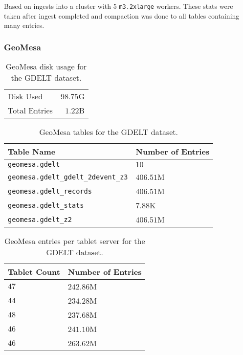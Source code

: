 Based on ingests into a cluster with $5$ \texttt{m3.2xlarge} workers.
These stats were taken after ingest completed and compaction was done to all tables containing many entries.

\subsubsection{GeoMesa}

\begin{table}[htb]
  \centering
  \begin{tabular}{ | l | r | }
    \hline
    Disk Used & $98.75$G \\
    Total Entries & $1.22$B \\
    \hline
  \end{tabular}
  \caption{GeoMesa disk usage for the GDELT dataset.}
  \label{table:gdelt:geomesa:disk}
\end{table}

\begin{table}[htb]
  \centering
  \begin{tabular}{ | l | l | }
    \hline
    Table Name & Number of Entries \\ \hline
    \texttt{geomesa.gdelt} & $10$ \\
    \texttt{geomesa.gdelt\_gdelt\_2devent\_z3} & $406.51$M \\
    \texttt{geomesa.gdelt\_records} & $406.51$M \\
    \texttt{geomesa.gdelt\_stats} & $7.88$K \\
    \texttt{geomesa.gdelt\_z2} & $406.51$M \\
    \hline
  \end{tabular}
  \caption{GeoMesa tables for the GDELT dataset.}
  \label{table:gdelt:geomesa:tables}
\end{table}

\begin{table}[htb]
  \centering
  \begin{tabular}{ | l| | l | }
    \hline
    Tablet Count & Number of Entries \\ \hline
    $47$ & $242.86$M \\
    $44$ & $234.28$M \\
    $48$ & $237.68$M \\
    $46$ & $241.10$M \\
    $46$ & $263.62$M \\
    \hline
  \end{tabular}
  \caption{GeoMesa entries per tablet server for the GDELT dataset.}
  \label{table:gdelt:geomesa:tablets}
\end{table}

